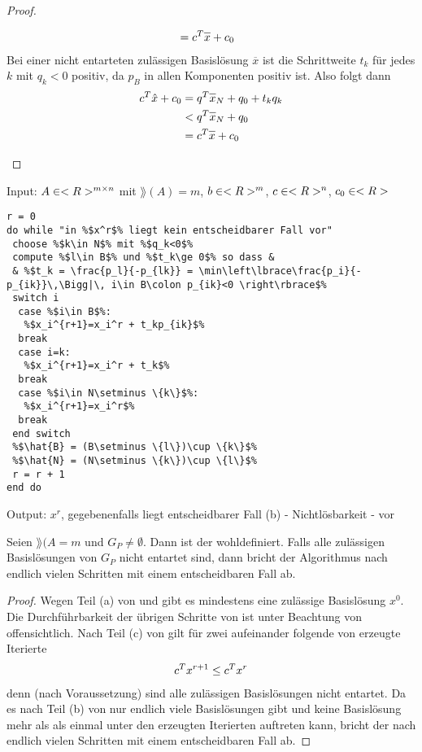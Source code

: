 \begin{proof}
\begin{enumerate}[label=(\alph*)]
\begin{align}
			&= c^T\overline{x} + c_0 \notag
		\end{align}
		Bei einer nicht entarteten zulässigen Basislösung $\overline{x}$ ist die Schrittweite $t_k$ für jedes $k$ mit $q_k<0$ positiv, da $p_B$ in allen Komponenten positiv ist. Also folgt dann
		\begin{align}
			c^T\hat{x}+c_0 &= q^T\overline{x}_N + q_0 + t_kq_k \notag \\
			&< q^T\overline{x}_N + q_0 \notag \\
			&= c^T\overline{x} + c_0 \notag
		\end{align}
	\end{enumerate}
\end{proof}

\begin{algorithm}
	Input: $A\in<R>^{m\times n}$ mit $\rang(A)=m$, $b\in<R>^m$, $c\in<R>^n$, $c_0\in<R>$
	\begin{lstlisting}
r = 0
do while "in %$x^r$% liegt kein entscheidbarer Fall vor"
 choose %$k\in N$% mit %$q_k<0$%
 compute %$l\in B$% und %$t_k\ge 0$% so dass &
 & %$t_k = \frac{p_l}{-p_{lk}} = \min\left\lbrace\frac{p_i}{-p_{ik}}\,\Bigg|\, i\in B\colon p_{ik}<0 \right\rbrace$%
 switch i
  case %$i\in B$%:
   %$x_i^{r+1}=x_i^r + t_kp_{ik}$%
  break
  case i=k:
   %$x_i^{r+1}=x_i^r + t_k$%
  break
  case %$i\in N\setminus \{k\}$%:
   %$x_i^{r+1}=x_i^r$%
  break
 end switch
 %$\hat{B} = (B\setminus \{l\})\cup \{k\}$%
 %$\hat{N} = (N\setminus \{k\})\cup \{l\}$%
 r = r + 1
end do
	\end{lstlisting}
	Output: $x^r$, gegebenenfalls liegt entscheidbarer Fall (b) - Nichtlösbarkeit - vor
\end{algorithm}

\begin{proposition}
	Seien $\rang(A=m$ und $G_P\neq\emptyset$. Dann ist der  wohldefiniert. Falls alle zulässigen Basislösungen von $G_P$ nicht entartet sind, dann bricht der Algorithmus nach endlich vielen Schritten mit einem entscheidbaren Fall ab.
\end{proposition}
\begin{proof}
	Wegen Teil (a) von  und  gibt es mindestens eine zulässige Basislösung $x^0$. Die Durchführbarkeit der übrigen Schritte von  ist unter Beachtung von  offensichtlich. Nach Teil (c) von  gilt für zwei aufeinander folgende von  erzeugte Iterierte 
	\begin{align}
		c^Tx^{r+1} \le c^T x^r \notag
	\end{align}
	denn (nach Voraussetzung) sind alle zulässigen Basislösungen nicht entartet. Da es nach Teil (b) von  nur endlich viele Basislösungen gibt und keine Basislösung mehr als als einmal unter den erzeugten Iterierten auftreten kann, bricht der  nach endlich vielen Schritten mit einem entscheidbaren Fall ab.
\end{proof}

